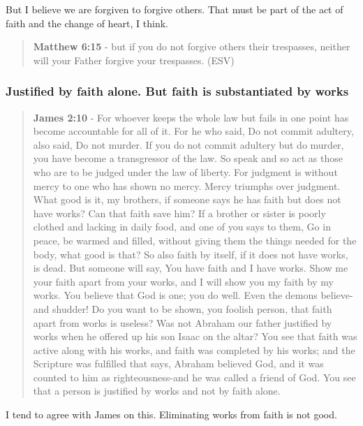 \documentclass[11pt]{article}
\begin{document}
But I believe we are forgiven to forgive others. That must be part of the act of faith and the change of heart, I think.

\begin{quote}
\textbf{Matthew 6:15} - but if you do not forgive others their trespasses, neither will your Father forgive your trespasses. (ESV)
\end{quote}

\subsubsection{Justified by faith alone. But faith is substantiated by works}
\label{sec:org37ef301}
\begin{quote}
\textbf{James 2:10} - For whoever keeps the whole law but fails in one point has become accountable for all of it. For he who said, Do not commit adultery, also said, Do not murder. If you do not commit adultery but do murder, you have become a transgressor of the law. So speak and so act as those who are to be judged under the law of liberty. For judgment is without mercy to one who has shown no mercy. Mercy triumphs over judgment. What good is it, my brothers, if someone says he has faith but does not have works? Can that faith save him? If a brother or sister is poorly clothed and lacking in daily food, and one of you says to them, Go in peace, be warmed and filled, without giving them the things needed for the body, what good is that? So also faith by itself, if it does not have works, is dead. But someone will say, You have faith and I have works. Show me your faith apart from your works, and I will show you my faith by my works. You believe that God is one; you do well. Even the demons believe-and shudder! Do you want to be shown, you foolish person, that faith apart from works is useless? Was not Abraham our father justified by works when he offered up his son Isaac on the altar? You see that faith was active along with his works, and faith was completed by his works; and the Scripture was fulfilled that says, Abraham believed God, and it was counted to him as righteousness-and he was called a friend of God. You see that a person is justified by works and not by faith alone.
\end{quote}

I tend to agree with James on this.
Eliminating works from faith is not good.
\end{document}
